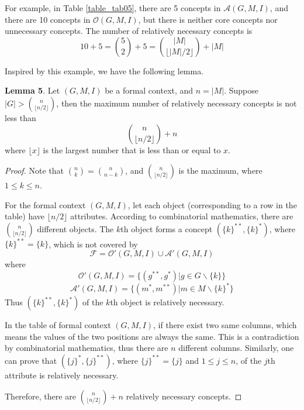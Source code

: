\documentclass[11pt]{article}
\numberwithin{equation}{subsection}
\begin{document}
For example, in Table \ref{table_tab05},  there are 5 concepts in $\mathcal{A}(G,M,I)$, and there are 10 concepts in $\mathcal{O}(G,M,I)$, but there is neither core concepts nor unnecessary concepts. The number of relatively necessary concepts is \[ 10+5= \binom{5 }{2}+5 = \binom{|M| }{\lfloor|M|/2\rfloor}+|M|
  \]


Inspired by this example, we have the following lemma.



\textbf{ Lemma 5}. Let $(G, M, I)$ be a formal context, and   $n=|M|$. Suppose $|G|>\binom{n }{\lfloor n/2\rfloor}$, then    the maximum number of  relatively necessary concepts is not less than \[
\binom{n }{\lfloor n/2\rfloor}+n
  \]
 where $\lfloor x\rfloor$ is the largest number that is less than or equal to $x$.

\begin{proof}

Note that $\binom{n }{k} = \binom{n }{n-k}$, and   $\binom{n }{\lfloor n/2\rfloor}$ is the maximum, where $1\leq k \leq n$.

For the formal context $(G, M, I)$, let each object (corresponding to a row in the table) have $ \lfloor n/2\rfloor $ attributes.
According to combinatorial mathematics, there are $\binom{n }{\lfloor n/2\rfloor}$ different objects. The $k$th  object forms a concept
$(\{k\}^{**}, \{k\}^*)$, where $\{k\}^{**} = \{k\}$, which is not covered by \[ \mathcal{F} = \mathcal{O}'(G,M,I) \cup  \mathcal{A}'(G,M,I) \]
where
\[   \mathcal{O}'(G,M,I)=\{ (g^{**},g^*)  | g\in G\backslash\{k\} \} \]
 \[     \mathcal{A}'(G,M,I)=\{ (m^{*},m^{**})  | m\in M\backslash \{k\}^*\} \]
Thus $(\{k\}^{**}, \{k\}^*)$ of the $k$th  object is relatively necessary.

In the table of formal context $(G, M, I)$, if there exist two same columns, which means the values of the two positions are always the same.
This is a contradiction by  combinatorial mathematics, thus there are $n$ different columns. Similarly, one can prove that
  $(\{j\}^{*}, \{j\}^{**})$,  where $\{j\}^{**}=\{j\}$ and $1\leq j \leq n$,   of the $j$th  attribute is relatively necessary.

  Therefore, there are $\binom{n }{\lfloor n/2\rfloor}+n$ relatively necessary concepts.

\end{proof}
\end{document}
